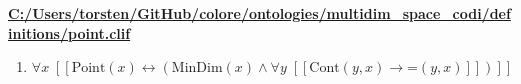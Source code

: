 \documentclass{article}
\begin{document}
\textbf{\url{C:/Users/torsten/GitHub/colore/ontologies/multidim\_space\_codi/definitions/point.clif}}

\begin{enumerate}
\item $\forall x\;  \left[ \left[ \textrm{Point}(x) \leftrightarrow \left(\textrm{MinDim}(x) \land \forall y\;  \left[ \left[ \textrm{Cont}(y,x) \rightarrow \textrm{=}(y,x) \right] \right]\right) \right] \right]$
\end{enumerate}
\end{document}
